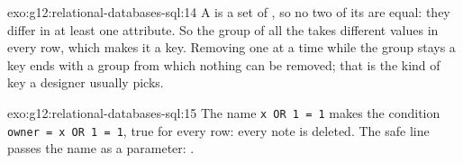 \begin{solution}{exo:g12:relational-databases-sql:14}
A  is a set of , so no two of its  are equal: they differ in at least one attribute. So the group of
all the  takes different values in every row, which makes it a key. Removing  one at a time while
the group stays a key ends with a group from which nothing can be removed; that is the kind of key a designer usually
picks.
\end{solution}

\begin{solution}{exo:g12:relational-databases-sql:15}
The name \texttt{x\textquotesingle{} OR \textquotesingle{}1\textquotesingle{} = \textquotesingle{}1} makes the condition \texttt{owner = \textquotesingle{}x\textquotesingle{} OR \textquotesingle{}1\textquotesingle{} = \textquotesingle{}1\textquotesingle{}}, true for every row: every note is
deleted. The safe line passes the name as a parameter:
.
\end{solution}

